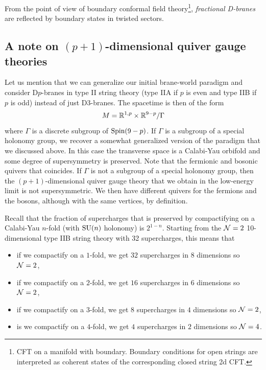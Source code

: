         From the point of view of boundary conformal field theory\footnote{CFT on a manifold with boundary. Boundary conditions for open strings are interpreted as coherent states of the corresponding closed string 2d CFT.}, \emph{fractional D-branes} are reflected by boundary states in twisted sectors.

    \subsection{A note on $(p+1)$-dimensional quiver gauge theories}

        Let us mention that we can generalize our initial brane-world paradigm and consider D$p$-branes in type II string theory (type IIA if $p$ is even and type IIB if $p$ is odd) instead of just D$3$-branes. The spacetime is then of the form
        \begin{equation}
            M = \mathbb{R}^{1,p}\times\mathbb{R}^{9-p}/\Gamma
        \end{equation}
        where $\Gamma$ is a discrete subgroup of $\text{Spin}(9-p)$. If $\Gamma$ is a subgroup of a special holonomy group, we recover a somewhat generalized version of the paradigm that we discussed above. In this case the transverse space is a Calabi-Yau orbifold and some degree of supersymmetry is preserved. Note that the fermionic and bosonic quivers that coincides. If $\Gamma$ is not a subgroup of a special holonomy group, then the $(p+1)$-dimensional quiver gauge theory that we obtain in the low-energy limit is not supersymmetric. We then have different quivers for the fermions and the bosons, although with the same vertices, by definition.

        Recall that the fraction of supercharges that is preserved by compactifying on a Calabi-Yau $n$-fold (with $\text{SU}(n)$ holonomy) is $2^{1-n}$. Starting from the $\mathcal{N}=2$ 10-dimensional type IIB string theory with 32 supercharges, this means that
        \begin{itemize}
            \item if we compactify on a $1$-fold, we get $32$ supercharges in $8$ dimensions so $\mathcal{N}=2$,
            \item if we compactify on a $2$-fold, we get $16$ supercharges in $6$ dimensions so $\mathcal{N}=2$,
            \item if we compactify on a $3$-fold, we get $8$ supercharges in $4$ dimensions so $\mathcal{N}=2$,
            \item is we compactify on a $4$-fold, we get $4$ supercharges in $2$ dimensions so $\mathcal{N}=4$.
        \end{itemize}


